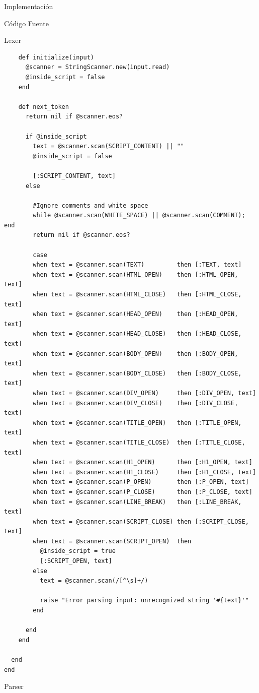 \documentclass[a4paper,8pt]{article}
\begin{document}
\begin{section}{Implementación}
\begin{subsection}{Código Fuente}
\begin{subsubsection}{Lexer}
\begin{verbatim}
    def initialize(input)
      @scanner = StringScanner.new(input.read)
      @inside_script = false
    end

    def next_token
      return nil if @scanner.eos?

      if @inside_script
        text = @scanner.scan(SCRIPT_CONTENT) || ""
        @inside_script = false
        
        [:SCRIPT_CONTENT, text]
      else

        #Ignore comments and white space
        while @scanner.scan(WHITE_SPACE) || @scanner.scan(COMMENT); end
        return nil if @scanner.eos?

        case
        when text = @scanner.scan(TEXT)         then [:TEXT, text]
        when text = @scanner.scan(HTML_OPEN)    then [:HTML_OPEN, text]
        when text = @scanner.scan(HTML_CLOSE)   then [:HTML_CLOSE, text]
        when text = @scanner.scan(HEAD_OPEN)    then [:HEAD_OPEN, text]
        when text = @scanner.scan(HEAD_CLOSE)   then [:HEAD_CLOSE, text]
        when text = @scanner.scan(BODY_OPEN)    then [:BODY_OPEN, text]
        when text = @scanner.scan(BODY_CLOSE)   then [:BODY_CLOSE, text]
        when text = @scanner.scan(DIV_OPEN)     then [:DIV_OPEN, text]
        when text = @scanner.scan(DIV_CLOSE)    then [:DIV_CLOSE, text]
        when text = @scanner.scan(TITLE_OPEN)   then [:TITLE_OPEN, text]
        when text = @scanner.scan(TITLE_CLOSE)  then [:TITLE_CLOSE, text]
        when text = @scanner.scan(H1_OPEN)      then [:H1_OPEN, text]
        when text = @scanner.scan(H1_CLOSE)     then [:H1_CLOSE, text]
        when text = @scanner.scan(P_OPEN)       then [:P_OPEN, text]
        when text = @scanner.scan(P_CLOSE)      then [:P_CLOSE, text]
        when text = @scanner.scan(LINE_BREAK)   then [:LINE_BREAK, text]
        when text = @scanner.scan(SCRIPT_CLOSE) then [:SCRIPT_CLOSE, text]
        when text = @scanner.scan(SCRIPT_OPEN)  then 
          @inside_script = true
          [:SCRIPT_OPEN, text]
        else
          text = @scanner.scan(/[^\s]+/)

          raise "Error parsing input: unrecognized string '#{text}'"
        end
    
      end
    end

  end
end

\end{verbatim}
\end{subsubsection}

\begin{subsubsection}{Parser}
\begin{verbatim}


\end{verbatim}
\end{subsubsection}
\end{subsection}
\end{section}
\end{document}
